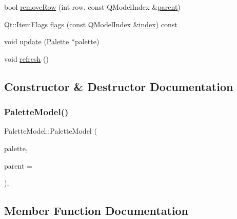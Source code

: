 \begin{DoxyCompactItemize}
bool \mbox{\hyperlink{class_palette_model_a0e33d4c77d50b7eebaa437508dd502fd}{remove\+Row}} (int row, const Q\+Model\+Index \&\mbox{\hyperlink{class_palette_model_aec318277f3470bebefbc5c54329c2bf0}{parent}})
\item 
Qt\+::\+Item\+Flags \mbox{\hyperlink{class_palette_model_abed3f62ed9707fa19887b724344bf705}{flags}} (const Q\+Model\+Index \&\mbox{\hyperlink{class_palette_model_a193464f0511b7d81c936162dbc613282}{index}}) const
\item 
void \mbox{\hyperlink{class_palette_model_aaef224b2d98b2edd66849f0822d6301a}{update}} (\mbox{\hyperlink{class_palette}{Palette}} $\ast$palette)
\item 
void \mbox{\hyperlink{class_palette_model_ad91a68da14777cd2c7a6ea6bc99b2856}{refresh}} ()
\end{DoxyCompactItemize}


\subsection{Constructor \& Destructor Documentation}
\mbox{\label{class_palette_model_a7ddfc1d43aab3f5112fc5faa1b1b5f5b}} 
\subsubsection{\texorpdfstring{PaletteModel()}{PaletteModel()}}
{\footnotesize\ttfamily Palette\+Model\+::\+Palette\+Model (\begin{DoxyParamCaption}\item[{\mbox{\hyperlink{class_palette}{Palette}} $\ast$}]{palette,  }\item[{Q\+Object $\ast$}]{parent = {} }\end{DoxyParamCaption})\hspace{0.3cm}{\ttfamily [inline]}, {\ttfamily [explicit]}}



\subsection{Member Function Documentation}
\mbox{\label{class_palette_model_a799e20927106996c71844ed5ea78732f}} 
